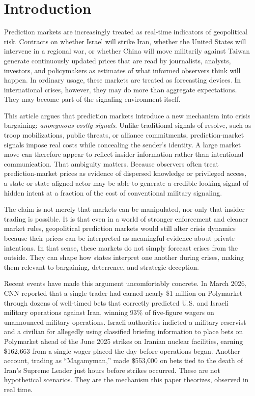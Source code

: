 \documentclass[12pt]{article}
\begin{document}
\section{Introduction}

Prediction markets are increasingly treated as real-time indicators of geopolitical risk. Contracts on whether Israel will strike Iran, whether the United States will intervene in a regional war, or whether China will move militarily against Taiwan generate continuously updated prices that are read by journalists, analysts, investors, and policymakers as estimates of what informed observers think will happen. In ordinary usage, these markets are treated as forecasting devices. In international crises, however, they may do more than aggregate expectations. They may become part of the signaling environment itself.

This article argues that prediction markets introduce a new mechanism into crisis bargaining: \textit{anonymous costly signals}. Unlike traditional signals of resolve, such as troop mobilizations, public threats, or alliance commitments, prediction-market signals impose real costs while concealing the sender's identity. A large market move can therefore appear to reflect insider information rather than intentional communication. That ambiguity matters. Because observers often treat prediction-market prices as evidence of dispersed knowledge or privileged access, a state or state-aligned actor may be able to generate a credible-looking signal of hidden intent at a fraction of the cost of conventional military signaling.

The claim is not merely that markets can be manipulated, nor only that insider trading is possible. It is that even in a world of stronger enforcement and cleaner market rules, geopolitical prediction markets would still alter crisis dynamics because their prices can be interpreted as meaningful evidence about private intentions. In that sense, these markets do not simply forecast crises from the outside. They can shape how states interpret one another during crises, making them relevant to bargaining, deterrence, and strategic deception.

Recent events have made this argument uncomfortably concrete. In March 2026, CNN reported that a single trader had earned nearly \$1 million on Polymarket through dozens of well-timed bets that correctly predicted U.S. and Israeli military operations against Iran, winning 93\% of five-figure wagers on unannounced military operations. Israeli authorities indicted a military reservist and a civilian for allegedly using classified briefing information to place bets on Polymarket ahead of the June 2025 strikes on Iranian nuclear facilities, earning \$162,663 from a single wager placed the day before operations began. Another account, trading as ``Magamyman,'' made \$553,000 on bets tied to the death of Iran's Supreme Leader just hours before strikes occurred. These are not hypothetical scenarios. They are the mechanism this paper theorizes, observed in real time.
\end{document}
